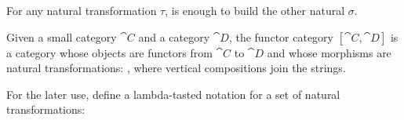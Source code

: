 \begin{proposition}
For any natural transformation $\tau$,
is enough to build the other natural $\sigma$.
\end{proposition}


\begin{definition}
Given a small category $\cat{C}$ and a category $\cat{D}$, %
the functor category
$
    [\cat{C},\cat{D}]
$
is a category whose objects are functors from $\cat{C}$ to $\cat{D}$ and %
whose morphisms are natural transformations:
, where vertical compositions join the strings. 
\end{definition}
\begin{definition}
For the later use, define a lambda-tasted notation for a set of natural transformations:
\end{definition}
